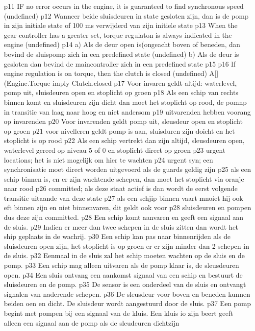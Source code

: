 p11 IF no error occurs in the engine, it is guaranteed to find synchronous speed (undefined)
p12 Wanneer beide sluisdeuren in state gesloten zijn, dan is de pomp in zijn initiale state of 100 ms verwijderd van zijn initiele state
p13 When the gear controller has a greater set, torque regulaton is always indicated in the engine (undefined)
p14
a) Als de deur open is(ongeacht boven of beneden, dan bevind de sluispomp zich in een  predefined state (undefined)
b) Als de deur is gesloten dan bevind de maincontroller zich in een predefined state
p15
p16 If engine regulation is on torque, then the clutch is closed (undefined)
A[](Engine.Torque imply Clutch.closed
p17
Voor invaren geldt altijd: waterlevel, pomp uit, sluisdeuren open en stoplicht op groen
p18 Als een schip van rechts binnen komt en sluisdeuren zijn dicht dan moet het stoplicht op rood, de pomnp in transitie van laag naar hoog en niet andersom
p19 uitvarenden hebben voorang op invarenden
p20 Voor invarenden geldt pomp uit, sleusdeur open en stoplicht op groen
p21 voor nivelleren geldt pomp is aan, sluisduren zijn doicht en het stoplicht is op rood
p22 Als een schip vertrekt dan zijn altijd, sleusdeuren open, waterlevel gereed op niveau 5 of 0 en stoplicht direct op groen
p23 urgent locations; het is niet mogelijk om hier te wachten
p24 urgent syn; een synchronisatie moet direct worden uitgevoerd als de guards geldig zijn
p25 als een schip binnen is, en er zijn wachtende schepen, dan moet het stoplicht via oranje naar rood
p26 committed; als deze staat actief is dan wordt de eerst volgende transitie uitaande van deze state
p27 als een schjip binnen vaart mnoiet hij ook eft binnen zijn en niet binnenvaren, dit geldt ook voor p28 sluisdeuren en pompen dus deze zijn committed.
p28 Een schip komt aanvaren en geeft een signaal aan de sluis. 	
p29 Indien er meer dan twee schepen in de sluis zitten dan wordt het ship geplaats in de wachrij. 
p30 Een schip kan pas naar binnenrijden als de sluisdeuren open zijn, het stoplicht is op groen er er zijn minder dan 2 schepen in de sluis. 	
p32 Eenmaal in de sluis zal het schip moeten wachten op de sluis en de pomp. 	
p33 Een schip mag alleen uitvaren als de pomp klaar is, de sleusdeuren open. 
p34 Een sluis ontvang een aankomst signaal van een schip en bestuurt de sluisdeuren en de pomp. 
p35 De sensor is een onderdeel van de sluis en ontvangt signalen van naderende schepen. 
p36 De sleusdeur voor boven en beneden kunnen beiden oen en dicht. De sluisdeur wordt aangestuurd door de sluis. 
p37 Een pomp begint met pompen bij een signaal van de kluis. Een kluis io zijn beert geeft alleen een signaal aan de pomp als de sleudeuren dichtzijn
